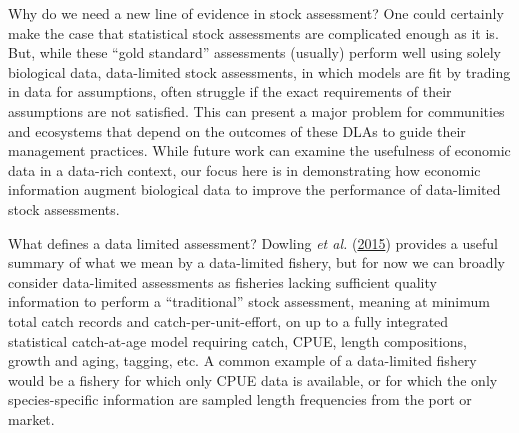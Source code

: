 \documentclass[twoside,12pt,final]{ucthesis-CA2012}
\begin{document}
\begin{ucmainmatter}
Why do we need a new line of evidence in stock assessment? One could
certainly make the case that statistical stock assessments are
complicated enough as it is. But, while these ``gold standard''
assessments (usually) perform well using solely biological data,
data-limited stock assessments, in which models are fit by trading in
data for assumptions, often struggle if the exact requirements of their
assumptions are not satisfied. This can present a major problem for
communities and ecosystems that depend on the outcomes of these DLAs to
guide their management practices. While future work can examine the
usefulness of economic data in a data-rich context, our focus here is in
demonstrating how economic information augment biological data to
improve the performance of data-limited stock assessments.

What defines a data limited assessment? Dowling \emph{et al.}
(\protect\hyperlink{ref-Dowling2015}{2015}) provides a useful summary of
what we mean by a data-limited fishery, but for now we can broadly
consider data-limited assessments as fisheries lacking sufficient
quality information to perform a ``traditional'' stock assessment,
meaning at minimum total catch records and catch-per-unit-effort, on up
to a fully integrated statistical catch-at-age model requiring catch,
CPUE, length compositions, growth and aging, tagging, etc. A common
example of a data-limited fishery would be a fishery for which only CPUE
data is available, or for which the only species-specific information
are sampled length frequencies from the port or market.


\end{ucmainmatter}
\end{document}
